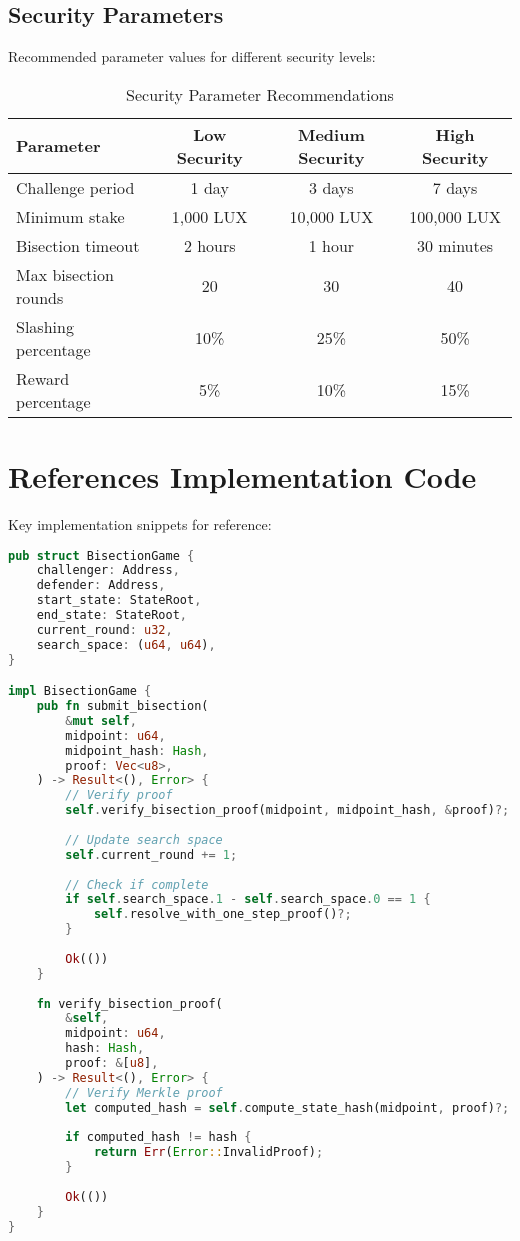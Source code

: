 \documentclass[11pt,a4paper]{article}
\theoremstyle{definition}
\begin{document}
\subsection{Security Parameters}

Recommended parameter values for different security levels:

\begin{table}[h]
\centering
\caption{Security Parameter Recommendations}
\begin{tabular}{lccc}
\toprule
\textbf{Parameter} & \textbf{Low Security} & \textbf{Medium Security} & \textbf{High Security} \\
\midrule
Challenge period & 1 day & 3 days & 7 days \\
Minimum stake & 1,000 LUX & 10,000 LUX & 100,000 LUX \\
Bisection timeout & 2 hours & 1 hour & 30 minutes \\
Max bisection rounds & 20 & 30 & 40 \\
Slashing percentage & 10\% & 25\% & 50\% \\
Reward percentage & 5\% & 10\% & 15\% \\
\bottomrule
\end{tabular}
\end{table}

\section{References Implementation Code}

Key implementation snippets for reference:

\begin{lstlisting}[language=Rust, caption=Bisection Game Implementation (Rust)]
pub struct BisectionGame {
    challenger: Address,
    defender: Address,
    start_state: StateRoot,
    end_state: StateRoot,
    current_round: u32,
    search_space: (u64, u64),
}

impl BisectionGame {
    pub fn submit_bisection(
        &mut self,
        midpoint: u64,
        midpoint_hash: Hash,
        proof: Vec<u8>,
    ) -> Result<(), Error> {
        // Verify proof
        self.verify_bisection_proof(midpoint, midpoint_hash, &proof)?;
        
        // Update search space
        self.current_round += 1;
        
        // Check if complete
        if self.search_space.1 - self.search_space.0 == 1 {
            self.resolve_with_one_step_proof()?;
        }
        
        Ok(())
    }
    
    fn verify_bisection_proof(
        &self,
        midpoint: u64,
        hash: Hash,
        proof: &[u8],
    ) -> Result<(), Error> {
        // Verify Merkle proof
        let computed_hash = self.compute_state_hash(midpoint, proof)?;
        
        if computed_hash != hash {
            return Err(Error::InvalidProof);
        }
        
        Ok(())
    }
}
\end{lstlisting}
\end{document}
